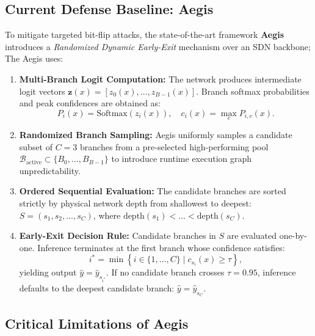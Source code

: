 \documentclass[conference,10pt]{IEEEtran}
\begin{document}
\subsection{Current Defense Baseline: Aegis}
To mitigate targeted bit-flip attacks, the state-of-the-art framework \textbf{Aegis}~\cite{wang2023aegis} introduces a \textit{Randomized Dynamic Early-Exit} mechanism over an SDN backbone; The Aegis uses:
\begin{enumerate}
    \item \textbf{Multi-Branch Logit Computation:} The network produces intermediate logit vectors $\mathbf{z}(x) = [z_0(x), \dots, z_{B-1}(x)]$. Branch softmax probabilities and peak confidences are obtained as:
    \begin{equation}
        P_i(x) = \text{Softmax}(z_i(x)), \quad c_i(x) = \max_{c} P_{i, c}(x).
    \end{equation}
    \item \textbf{Randomized Branch Sampling:} Aegis uniformly samples a candidate subset of $C = 3$ branches from a pre-selected high-performing pool $\mathcal{B}_{\text{active}} \subset \{B_0, \dots, B_{B-1}\}$ to introduce runtime execution graph unpredictability.
    \item \textbf{Ordered Sequential Evaluation:} The candidate branches are sorted strictly by physical network depth from shallowest to deepest: $S = (s_1, s_2, \dots, s_C)$, where $\text{depth}(s_1) < \dots < \text{depth}(s_C)$.
    \item \textbf{Early-Exit Decision Rule:} Candidate branches in $S$ are evaluated one-by-one. Inference terminates at the first branch whose confidence satisfies:
    \begin{equation}
        i^* = \min \left\{ i \in \{1, \dots, C\} \mid c_{s_i}(x) \ge \tau \right\},
    \end{equation}
    yielding output $\hat{y} = \hat{y}_{s_{i^*}}$. If no candidate branch crosses $\tau = 0.95$, inference defaults to the deepest candidate branch: $\hat{y} = \hat{y}_{s_C}$.
\end{enumerate}

\subsection{Critical Limitations of Aegis}
\end{document}
